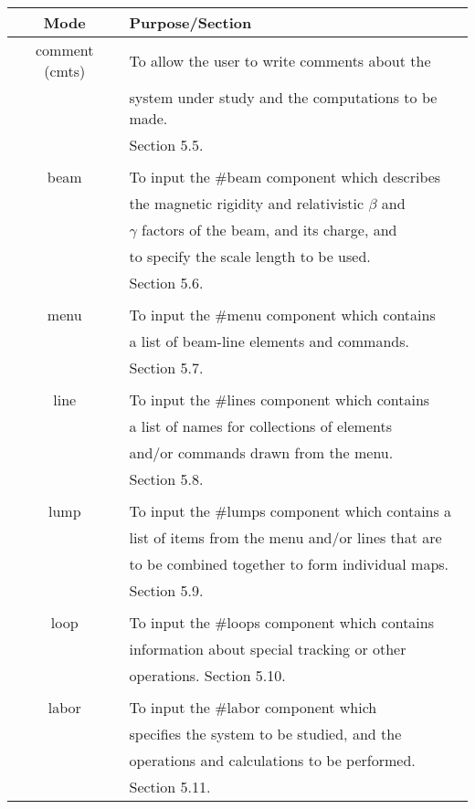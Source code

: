 \begin{center}
\begin{tabular}{|c|l|} \hline Mode & Purpose/Section \\ \hline comment
(cmts) & To allow the user to write comments about the \\ & system under
study and the computations to be made.\\ & Section 5.5. \\ & \\ beam & To
input the \#beam component which describes \\ & the magnetic rigidity and
relativistic $\beta$ and \\ & $\gamma$ factors of the beam, and its charge,
and \\ & to specify the scale length to be used. \\ & Section 5.6. \\ & \\
menu & To input the \#menu component which contains \\ & a list of
beam-line elements and commands. \\ & Section 5.7. \\ & \\ line & To input
the \#lines component which contains \\ & a list of names for collections
of elements \\ & and/or commands drawn from the menu. \\ & Section 5.8. \\
& \\ lump & To input the \#lumps component which contains a \\ & list of
items from the menu and/or lines that are \\ & to be combined together to
form individual maps.\\ & Section 5.9. \\ & \\ loop & To input the \#loops
component which contains \\ & information about special tracking or other
\\ & operations. Section 5.10. \\ & \\ labor & To input the \#labor
component which \\ & specifies the system to be studied, and the \\ &
operations and calculations to be performed.\\ & Section 5.11. \\ \hline
\end{tabular}
\end{center}

